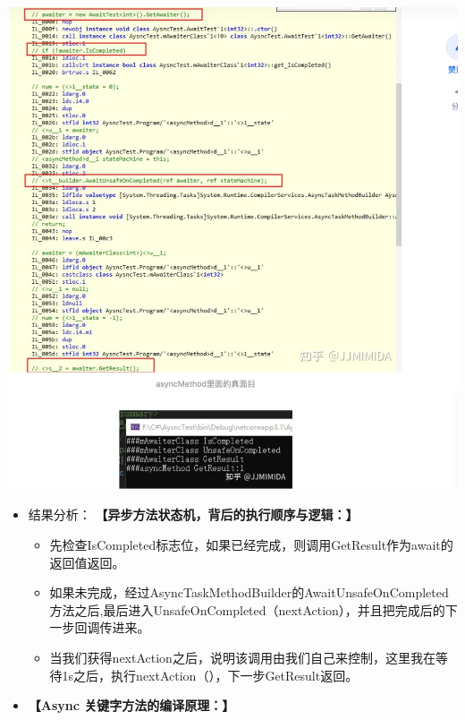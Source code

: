 \documentclass[9pt, b5paper]{article}
\begin{document}
\begin{center}
\includegraphics[width=.9\linewidth]{./pic/et3_20230609_112727.png}
\end{center}
\begin{itemize}
\item 结果分析： \textbf{【异步方法状态机，背后的执行顺序与逻辑：】}
\begin{itemize}
\item 先检查IsCompleted标志位，如果已经完成，则调用GetResult作为await的返回值返回。
\item 如果未完成，经过AsyncTaskMethodBuilder的AwaitUnsafeOnCompleted方法之后,最后进入UnsafeOnCompleted（nextAction），并且把完成后的下一步回调传进来。
\item 当我们获得nextAction之后，说明该调用由我们自己来控制，这里我在等待1s之后，执行nextAction（），下一步GetResult返回。
\end{itemize}
\item \textbf{【Async 关键字方法的编译原理：】}
\end{itemize}
\end{document}

